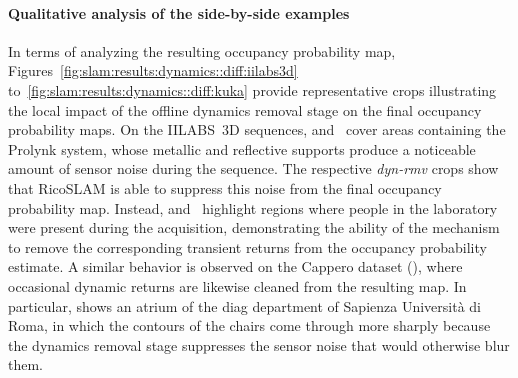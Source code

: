 \paragraph{Qualitative analysis of the side-by-side examples}
In terms of analyzing the resulting occupancy probability map,
Figures~\ref{fig:slam:results:dynamics::diff:iilabs3d}
to~\ref{fig:slam:results:dynamics::diff:kuka} provide
representative crops illustrating the local impact of the offline
dynamics removal stage on the final occupancy probability maps.
On the IILABS~3D sequences,
and~ cover
areas containing the Prolynk system, whose metallic and reflective
supports produce a noticeable amount of sensor noise during the
sequence. The respective \emph{dyn-rmv} crops show that RicoSLAM is able to
suppress this noise from the final occupancy probability map.
Instead, 
and~
highlight regions where people in the laboratory were
present during the acquisition, demonstrating the ability of the mechanism to
remove the corresponding transient returns from the occupancy
probability estimate. A similar behavior is observed on the Cappero
dataset (), where
occasional dynamic returns are likewise cleaned from the resulting
map. In particular, 
shows an atrium of the \gls{diag} department of Sapienza Università di Roma, in
which the contours of the chairs come through more sharply because the dynamics
removal stage suppresses the sensor noise that would otherwise blur them.

